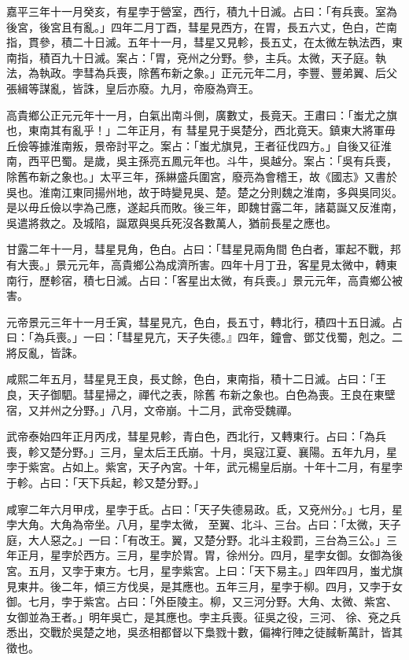 \begin{pinyinscope}
 嘉平三年十一月癸亥，有星孛于營室，西行，積九十日滅。占曰：「有兵喪。室為後宮，後宮且有亂。」四年二月丁酉，彗星見西方，在胃，長五六丈，色白，芒南指，貫參，積二十日滅。五年十一月，彗星又見軫，長五丈，在太微左執法西，東南指，積百九十日滅。案占：「胃，兗州之分野。參，主兵。太微，天子庭。執法，為執政。孛彗為兵喪，除舊布新之象。」正元元年二月，李豐、豐弟翼、后父張緝等謀亂，皆誅，皇后亦廢。九月，帝廢為齊王。



 高貴鄉公正元元年十一月，白氣出南斗側，廣數丈，長竟天。王肅曰：「蚩尤之旗也，東南其有亂乎！」二年正月，有
 彗星見于吳楚分，西北竟天。鎮東大將軍毋丘儉等據淮南叛，景帝討平之。案占：「蚩尤旗見，王者征伐四方。」自後又征淮南，西平巴蜀。是歲，吳主孫亮五鳳元年也。斗牛，吳越分。案占：「吳有兵喪，除舊布新之象也。」太平三年，孫綝盛兵圍宮，廢亮為會稽王，故《國志》又書於吳也。淮南江東同揚州地，故于時變見吳、楚。楚之分則魏之淮南，多與吳同災。是以毋丘儉以孛為己應，遂起兵而敗。後三年，即魏甘露二年，諸葛誕又反淮南，吳遣將救之。及城陷，誕眾與吳兵死沒各數萬人，猶前長星之應也。



 甘露二年十一月，彗星見角，色白。占曰：「彗星見兩角間
 色白者，軍起不戰，邦有大喪。」景元元年，高貴鄉公為成濟所害。四年十月丁丑，客星見太微中，轉東南行，歷軫宿，積七日滅。占曰：「客星出太微，有兵喪。」景元元年，高貴鄉公被害。



 元帝景元三年十一月壬寅，彗星見亢，色白，長五寸，轉北行，積四十五日滅。占曰：「為兵喪。」一曰：「彗星見亢，天子失德。』四年，鐘會、鄧艾伐蜀，剋之。二將反亂，皆誅。



 咸熙二年五月，彗星見王良，長丈餘，色白，東南指，積十二日滅。占曰：「王良，天子御駟。彗星掃之，禪代之表，除舊
 布新之象也。白色為喪。王良在東壁宿，又并州之分野。」八月，文帝崩。十二月，武帝受魏禪。



 武帝泰始四年正月丙戌，彗星見軫，青白色，西北行，又轉東行。占曰：「為兵喪，軫又楚分野。」三月，皇太后王氏崩。十月，吳寇江夏、襄陽。五年九月，星孛于紫宮。占如上。紫宮，天子內宮。十年，武元楊皇后崩。十年十二月，有星孛于軫。占曰：「天下兵起，軫又楚分野。」



 咸寧二年六月甲戌，星孛于氐。占曰：「天子失德易政。氐，又兗州分。」七月，星孛大角。大角為帝坐。八月，星孛太微，
 至翼、北斗、三台。占曰：「太微，天子庭，大人惡之。」一曰：「有改王。翼，又楚分野。北斗主殺罰，三台為三公。」三年正月，星孛於西方。三月，星孛於胃。胃，徐州分。四月，星孛女御。女御為後宮。五月，又孛于東方。七月，星孛紫宮。上曰：「天下易主。」四年四月，蚩尤旗見東井。後二年，傾三方伐吳，是其應也。五年三月，星孛于柳。四月，又孛于女御。七月，孛于紫宮。占曰：「外臣陵主。柳，又三河分野。大角、太微、紫宮、女御並為王者。」明年吳亡，是其應也。孛主兵喪。征吳之役，三河、
 徐、兗之兵悉出，交戰於吳楚之地，吳丞相都督以下梟戮十數，偏裨行陣之徒馘斬萬計，皆其徵也。




\end{pinyinscope}
